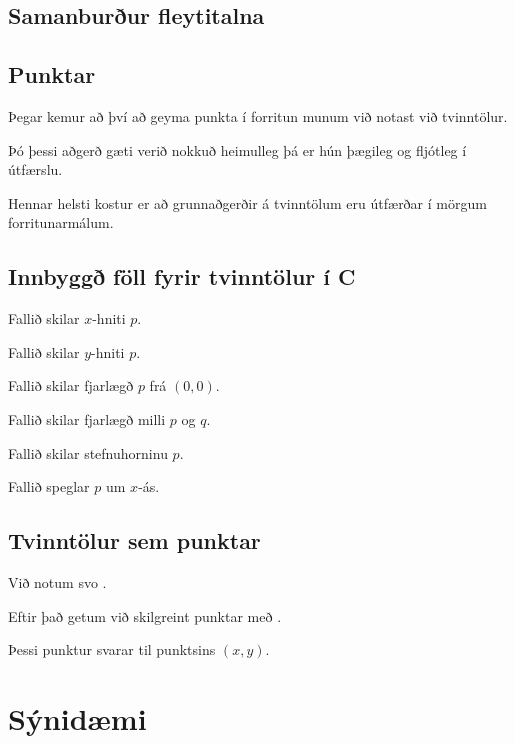 \subsection{Samanburður fleytitalna}
{
}

\subsection{Punktar}
{
    {
        \item<1-> Þegar kemur að því að geyma punkta í forritun munum við notast við tvinntölur.
        \item<2-> Þó þessi aðgerð gæti verið nokkuð heimulleg þá er hún þægileg og fljótleg í útfærslu.
        \item<3-> Hennar helsti kostur er að grunnaðgerðir á tvinntölum eru útfærðar í mörgum forritunarmálum.
    }
}

\subsection{Innbyggð föll fyrir tvinntölur í C}
{
    {
        \item<1-> Fallið  skilar $x$-hniti $p$.
        \item<2-> Fallið  skilar $y$-hniti $p$.
        \item<3-> Fallið  skilar fjarlægð $p$ frá $(0, 0)$.
        \item<4-> Fallið  skilar fjarlægð milli $p$ og $q$.
        \item<5-> Fallið  skilar stefnuhorninu $p$.
        \item<6-> Fallið  speglar $p$ um $x$-ás.
    }
}

\subsection{Tvinntölur sem punktar}
{
    {
        \item<1-> Við notum svo .
        \item<2-> Eftir það getum við skilgreint punktar með .
        \item<3-> Þessi punktur svarar til punktsins $(x, y)$.
    }
}

\section{Sýnidæmi}
